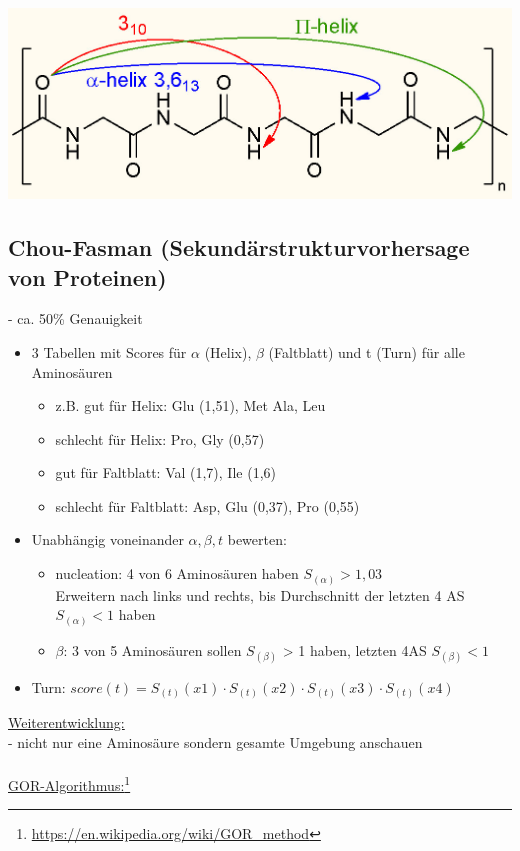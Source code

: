 \includegraphics[width=1\textwidth]{lectures/160530/pix/Hydrogen_bridging_in_proteins.jpg}

\subsection{Chou-Fasman (Sekundärstrukturvorhersage von Proteinen)}
 - ca. 50\% Genauigkeit
\begin{itemize}
	\item 3 Tabellen mit Scores für $\alpha$ (Helix), $\beta$ (Faltblatt) und t (Turn) für alle Aminosäuren
	\begin{itemize}
		\item z.B. gut für Helix: Glu (1,51), Met Ala, Leu
		\item schlecht für Helix: Pro, Gly (0,57)
		\item gut für Faltblatt: Val (1,7), Ile (1,6)
		\item schlecht für Faltblatt: Asp, Glu (0,37), Pro (0,55)
	\end{itemize}
	\item Unabhängig voneinander $\alpha, \beta, t$ bewerten:
	\begin{itemize}
		\item nucleation: 4 von 6 Aminosäuren haben $S_{(\alpha)} > 1,03$\\
		Erweitern nach links und rechts, bis Durchschnitt der letzten 4 AS $S_{(\alpha)} < 1$ haben
		\item $\beta$: 3 von 5 Aminosäuren sollen $S_{(\beta)}$ > 1 haben, letzten 4AS $S_{(\beta)} < 1$
	\end{itemize}
		\item Turn: $score(t)=S_{(t)}(x1) \cdot S_{(t)}(x2) \cdot S_{(t)}(x3) \cdot S_{(t)}(x4)$
\end{itemize}

\underline{Weiterentwicklung:}\\
 - nicht nur eine Aminosäure sondern gesamte Umgebung anschauen\\\\
\underline{GOR-Algorithmus:}\footnote{\url{https://en.wikipedia.org/wiki/GOR_method}}\\

